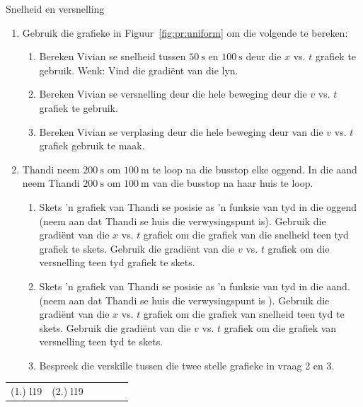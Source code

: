 \begin{exercises}{Snelheid en versnelling}
\begin{enumerate}[noitemsep, label=\textbf{\arabic*}. ] 
\item Gebruik die grafieke in Figuur~\ref{fig:pr:uniform} om die volgende te bereken:
\begin{enumerate}[noitemsep, label=\textbf{\alph*}. ] 
    \item Bereken Vivian se snelheid tussen $50~\text{s}$ en $100~\text{s}$ deur die $x$ vs. $t$ grafiek te gebruik. Wenk: Vind die gradi\"ent van die lyn.
    \item Bereken Vivian se versnelling deur die hele beweging deur die $v$ vs. $t$ grafiek te gebruik.
    \item Bereken Vivian se verplasing deur die hele beweging deur van die $v$ vs. $t$ grafiek gebruik te maak.
\end{enumerate}

\item Thandi neem $200~\text{s}$ om  $100~\text{m}$ te loop na die busstop elke oggend. In die aand neem Thandi $200~\text{s}$ om $100~\text{m}$ van die busstop na haar huis te loop.

\begin{enumerate}[noitemsep, label=\textbf{\alph*}. ] 
    \item  Skets  'n grafiek van Thandi se posisie as  'n funksie van tyd in die oggend (neem aan dat Thandi se huis die verwysingspunt is). Gebruik die gradi\"ent van die $x$ vs. $t$ grafiek om die grafiek van die snelheid teen tyd grafiek te skets. Gebruik die gradi\"ent van die $v$ vs. $t$ grafiek om die versnelling teen tyd grafiek te skets.
    \item  Skets  'n grafiek van Thandi se posisie as  'n funksie van tyd in die aand. (neem aan dat Thandi se huis die verwysingspunt is ). Gebruik die gradi\"ent van die $x$ vs. $t$ grafiek om die grafiek van snelheid teen tyd te skets. Gebruik die gradi\"ent van die $v$ vs. $t$ grafiek om die grafiek van versnelling teen tyd te skets.
    \item Bespreek die verskille tussen die twee stelle grafieke in vraag 2 en 3.
\end{enumerate}
\end{enumerate}

\practiceinfo
\par \begin{tabular}[h]{cccccc}
(1.) l19  &  (2.) l19  & \end{tabular}
\end{exercises}



